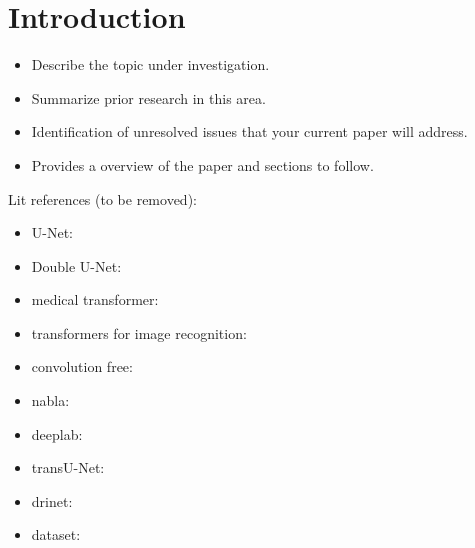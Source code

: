 \section{Introduction}

\begin{itemize}
  \item Describe the topic under investigation.
  \item Summarize prior research in this area.
  \item Identification of unresolved issues that your current paper will address.
  \item Provides a overview of the paper and sections to follow.
\end{itemize}


Lit references (to be removed):
\begin{itemize}
  \item U-Net: \citep{unet-2015-ronneberger}
  \item Double U-Net: \citep{double_unet-2020-jha}
  \item medical transformer: \citep{medical_transformer-2021-valanarasu}
  \item transformers for image recognition: \citep{transformers-2020-dosovitskiy}
  \item convolution free: \citep{convolution_free-2021-karimi}
  \item nabla: \citep{nabla-2019-alom}
  \item deeplab: \citep{deeplab-2016-chen}
  \item transU-Net: \citep{transunet-2021-chen}
  \item drinet: \citep{drinet-2018-chen}
  \item dataset: \citep{isic-2018-segmentation}
\end{itemize}

